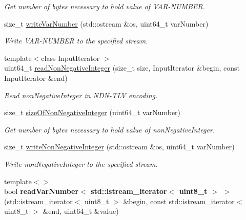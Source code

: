 \begin{DoxyCompactItemize}
\begin{DoxyCompactList}\small\item\em Get number of bytes necessary to hold value of V\+A\+R-\/\+N\+U\+M\+B\+ER. \end{DoxyCompactList}\item 
size\+\_\+t \hyperlink{namespacendn_1_1tlv_a1241195c732531b6d90acb22e5101ed0}{write\+Var\+Number} (std\+::ostream \&os, uint64\+\_\+t var\+Number)\hypertarget{namespacendn_1_1tlv_a1241195c732531b6d90acb22e5101ed0}{}\label{namespacendn_1_1tlv_a1241195c732531b6d90acb22e5101ed0}

\begin{DoxyCompactList}\small\item\em Write V\+A\+R-\/\+N\+U\+M\+B\+ER to the specified stream. \end{DoxyCompactList}\item 
{\footnotesize template$<$class Input\+Iterator $>$ }\\uint64\+\_\+t \hyperlink{namespacendn_1_1tlv_afb17980329ebcc5451da54dd16b93253}{read\+Non\+Negative\+Integer} (size\+\_\+t size, Input\+Iterator \&begin, const Input\+Iterator \&end)
\begin{DoxyCompactList}\small\item\em Read non\+Negative\+Integer in N\+D\+N-\/\+T\+LV encoding. \end{DoxyCompactList}\item 
size\+\_\+t \hyperlink{namespacendn_1_1tlv_a0195029be1555608135a352a2e075bfb}{size\+Of\+Non\+Negative\+Integer} (uint64\+\_\+t var\+Number)\hypertarget{namespacendn_1_1tlv_a0195029be1555608135a352a2e075bfb}{}\label{namespacendn_1_1tlv_a0195029be1555608135a352a2e075bfb}

\begin{DoxyCompactList}\small\item\em Get number of bytes necessary to hold value of non\+Negative\+Integer. \end{DoxyCompactList}\item 
size\+\_\+t \hyperlink{namespacendn_1_1tlv_a2ef6eabd116a614c32b4976ae25bf5f4}{write\+Non\+Negative\+Integer} (std\+::ostream \&os, uint64\+\_\+t var\+Number)\hypertarget{namespacendn_1_1tlv_a2ef6eabd116a614c32b4976ae25bf5f4}{}\label{namespacendn_1_1tlv_a2ef6eabd116a614c32b4976ae25bf5f4}

\begin{DoxyCompactList}\small\item\em Write non\+Negative\+Integer to the specified stream. \end{DoxyCompactList}\item 
{\footnotesize template$<$$>$ }\\bool {\bfseries read\+Var\+Number$<$ std\+::istream\+\_\+iterator$<$ uint8\+\_\+t $>$ $>$} (std\+::istream\+\_\+iterator$<$ uint8\+\_\+t $>$ \&begin, const std\+::istream\+\_\+iterator$<$ uint8\+\_\+t $>$ \&end, uint64\+\_\+t \&value)\hypertarget{namespacendn_1_1tlv_ab615da10c8425225b977264075ecf129}{}\label{namespacendn_1_1tlv_ab615da10c8425225b977264075ecf129}


\end{DoxyCompactItemize}
